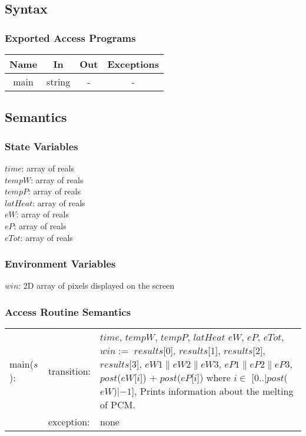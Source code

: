 \documentclass[12pt]{article}
\begin{document}
\subsection{Syntax}
\subsubsection{Exported Access Programs}
\begin{center}
\begin{tabular}{c c c c}
\hline
\textbf{Name} & \textbf{In} & \textbf{Out} & \textbf{Exceptions} \\
\hline
main & string & - & - \\
\hline
\end{tabular}
\end{center}
\subsection{Semantics}
\subsubsection{State Variables}
$time$: array of reals \\
$tempW$: array of reals \\
$tempP$: array of reals \\
$latHeat$: array of reals \\
$eW$: array of reals \\
$eP$: array of reals \\ 
$eTot$: array of reals
\subsubsection{Environment Variables}
$win$: 2D array of pixels displayed on the screen
\subsubsection{Access Routine Semantics}
\begin{tabular}{l l p{12cm}}
main($s$): & transition: & $time$, $tempW$, $tempP$, $latHeat$ $eW$, $eP$, $eTot$, $win :=$ $results$[0], $results$[1], $results$[2], $results$[3], $eW1 \| eW2 \| eW3$, $eP1 \| eP2 \| eP3$, $post$($eW$[$i$]) $+$ $post$($eP$[$i$]) where $i \in$ [0..$|post$($eW$)$| - 1$], Prints information about the melting of PCM. \\
& exception: & none \\
\end{tabular}
\end{document}
